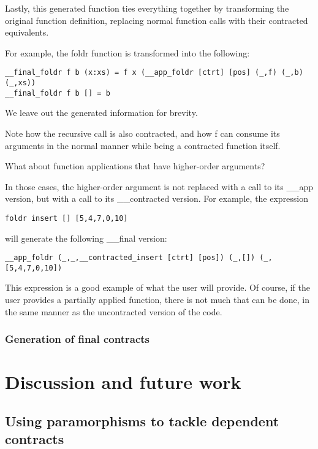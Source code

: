 \documentclass[10pt]{report}
\begin{document}
Lastly, this generated function ties everything together by transforming the original function definition, replacing normal function calls with their contracted equivalents.

For example, the foldr function is transformed into the following:

\begin{lstlisting}
__final_foldr f b (x:xs) = f x (__app_foldr [ctrt] [pos] (_,f) (_,b) (_,xs))
__final_foldr f b [] = b
\end{lstlisting}

We leave out the generated information for brevity.

Note how the recursive call is also contracted, and how f can consume its arguments in the normal manner while being a contracted function itself.

What about function applications that have higher-order arguments?

In those cases, the higher-order argument is not replaced with a call to its \_\_app version, but with a call to its \_\_contracted version.
For example, the expression

\begin{lstlisting}
foldr insert [] [5,4,7,0,10]
\end{lstlisting}

will generate the following \_\_final version:

\begin{lstlisting}
__app_foldr (_,_,__contracted_insert [ctrt] [pos]) (_,[]) (_,[5,4,7,0,10])
\end{lstlisting}

This expression is a good example of what the user will provide.
Of course, if the user provides a partially applied function, there is not much that can be done, in the same manner as the uncontracted version of the code.

\subsection{Generation of final contracts}

\chapter{Discussion and future work}
\label{futurework}

\section{Using paramorphisms to tackle dependent contracts}
\end{document}
